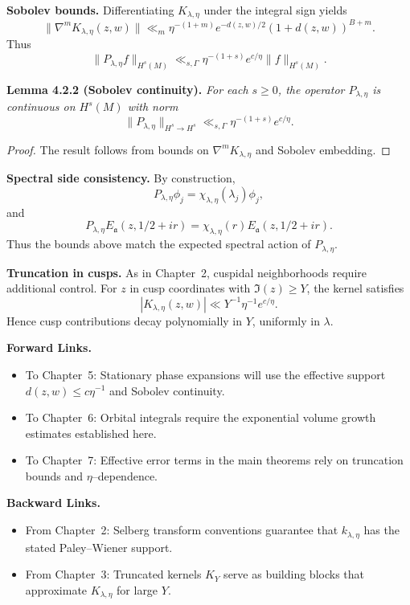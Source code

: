 \noindent\textbf{Sobolev bounds.}
Differentiating $K_{\lambda,\eta}$ under the integral sign yields
\[
  \|\nabla^m K_{\lambda,\eta}(z,w)\| \ll_{m} \eta^{-(1+m)} e^{-d(z,w)/2}(1+d(z,w))^{B+m}.
\]
Thus
\[
  \|P_{\lambda,\eta} f\|_{H^s(M)} \ll_{s,\Gamma} \eta^{-(1+s)} e^{c/\eta} \|f\|_{H^s(M)}.
\]

\medskip

\noindent\textbf{Lemma 4.2.2 (Sobolev continuity).}
\emph{For each $s\ge 0$, the operator $P_{\lambda,\eta}$ is continuous on $H^s(M)$ with norm}
\[
  \|P_{\lambda,\eta}\|_{H^s\to H^s} \ll_{s,\Gamma} \eta^{-(1+s)} e^{c/\eta}.
\]

\begin{proof}
The result follows from bounds on $\nabla^m K_{\lambda,\eta}$ and Sobolev embedding.
\end{proof}

\medskip

\noindent\textbf{Spectral side consistency.}
By construction,
\[
  P_{\lambda,\eta}\phi_j = \chi_{\lambda,\eta}(\lambda_j)\phi_j,
\]
and
\[
  P_{\lambda,\eta}E_{\mathfrak{a}}(z,1/2+ir) = \chi_{\lambda,\eta}(r) E_{\mathfrak{a}}(z,1/2+ir).
\]
Thus the bounds above match the expected spectral action of $P_{\lambda,\eta}$.

\medskip

\noindent\textbf{Truncation in cusps.}
As in Chapter~2,
cuspidal neighborhoods require additional control.
For $z$ in cusp coordinates with $\Im(z)\ge Y$,
the kernel satisfies
\[
  |K_{\lambda,\eta}(z,w)| \ll Y^{-1}\eta^{-1} e^{c/\eta}.
\]
Hence cusp contributions decay polynomially in $Y$,
uniformly in $\lambda$.

\medskip

\noindent\textbf{Forward Links.}
\begin{itemize}
  \item To Chapter~5: Stationary phase expansions will use the effective support $d(z,w)\le c\eta^{-1}$ and Sobolev continuity.
  \item To Chapter~6: Orbital integrals require the exponential volume growth estimates established here.
  \item To Chapter~7: Effective error terms in the main theorems rely on truncation bounds and $\eta$–dependence.
\end{itemize}

\medskip

\noindent\textbf{Backward Links.}
\begin{itemize}
  \item From Chapter~2: Selberg transform conventions guarantee that $k_{\lambda,\eta}$ has the stated Paley–Wiener support.
  \item From Chapter~3: Truncated kernels $K_Y$ serve as building blocks that approximate $K_{\lambda,\eta}$ for large $Y$.
\end{itemize}

